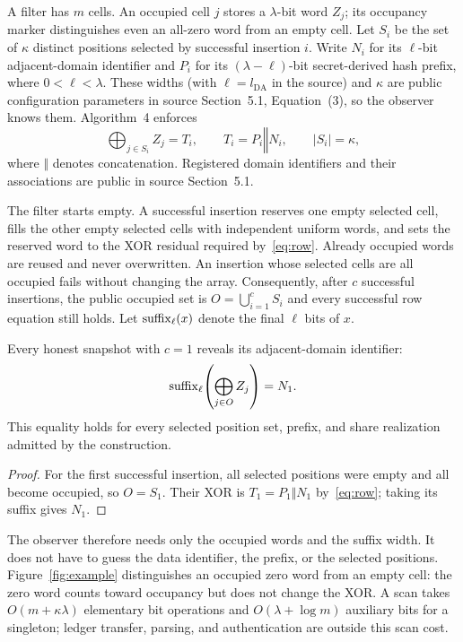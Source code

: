 A filter has $m$ cells. An occupied cell $j$ stores a $\lambda$-bit word $Z_j$;
its occupancy marker distinguishes even an all-zero word from an empty cell.
Let $S_i$ be the set of $\kappa$ distinct positions selected by successful
insertion $i$. Write $N_i$ for its $\ell$-bit adjacent-domain identifier and
$P_i$ for its $(\lambda-\ell)$-bit secret-derived hash prefix, where
$0<\ell<\lambda$. These widths (with $\ell=l_{\mathrm{DA}}$ in the source)
and $\kappa$ are public configuration
parameters in source Section~5.1, Equation~(3), so the observer knows them.
Algorithm~4 enforces
\begin{equation}
  \bigoplus_{j\in S_i} Z_j = T_i,
  \qquad T_i=P_i\mathbin\Vert N_i,
  \qquad |S_i|=\kappa,
  \label{eq:row}
\end{equation}
where $\Vert$ denotes concatenation. Registered domain identifiers and their
associations are public in source Section~5.1.

The filter starts empty. A successful insertion reserves one empty selected
cell, fills the other empty selected cells with independent uniform words,
and sets the reserved word to the XOR residual required by~\eqref{eq:row}.
Already occupied words are reused and never overwritten. An insertion whose
selected cells are all occupied fails without changing the array. Consequently,
after $c$ successful insertions, the public occupied set is
$O=\bigcup_{i=1}^{c}S_i$ and every successful row equation still holds.
Let $\operatorname{suffix}_\ell(x)$ denote the final $\ell$ bits of $x$.

\begin{proposition}
\label{prop:singleton}
Every honest snapshot with $c=1$ reveals its adjacent-domain identifier:
\begin{equation}
  \operatorname{suffix}_\ell\!\left(\bigoplus_{j\in O}Z_j\right)=N_1.
  \label{eq:singleton}
\end{equation}
This equality holds for every selected position set, prefix, and share
realization admitted by the construction.
\end{proposition}

\begin{proof}
For the first successful insertion, all selected positions were empty and
all become occupied, so $O=S_1$. Their XOR is $T_1=P_1\Vert N_1$
by~\eqref{eq:row}; taking its suffix gives $N_1$.
\end{proof}

The observer therefore needs only the occupied words and the suffix width.
It does not have to guess the data identifier, the prefix, or the selected
positions. Figure~\ref{fig:example} distinguishes an occupied zero word from
an empty cell: the zero word counts toward occupancy but does not change the XOR.
A scan takes
$O(m+\kappa\lambda)$ elementary bit operations and
$O(\lambda+\log m)$ auxiliary bits for a singleton; ledger transfer,
parsing, and authentication are outside this scan cost.

